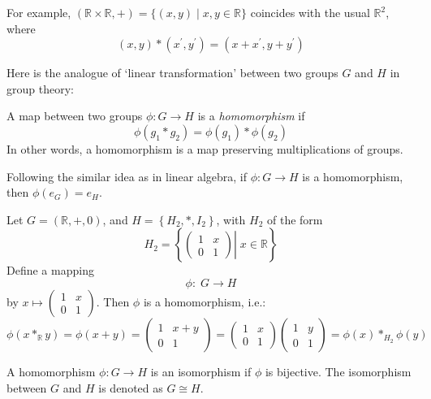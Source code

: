 For example, \(\left( {\mathbb{R} \times  \mathbb{R}, + }\right)  = \{ \left( {x,y}\right)  \mid  x,y \in  \mathbb{R}\}\) coincides with the usual \({\mathbb{R}}^{2}\), where
\[
\left( {x,y}\right)  * \left( {{x}^{\prime },{y}^{\prime }}\right)  = \left( {x + {x}^{\prime },y + {y}^{\prime }}\right)
\]

Here is the analogue of `linear transformation' between two groups $G$ and $H$ in group theory:
\begin{definition} A map between two groups \(\phi  : G \rightarrow  H\) is a \emph{homomorphism} if
\[
\phi \left( {{g}_{1} * {g}_{2}}\right)  = \phi \left( {g}_{1}\right)  * \phi \left( {g}_{2}\right)
\]
In other words, a homomorphism is a map preserving multiplications of groups.
\end{definition}
Following the similar idea as in linear algebra, if \(\phi  : G \rightarrow  H\) is a homomorphism, then \(\phi \left( {e}_{G}\right)  = {e}_{H}\).

\begin{example} Let \(G = \left( {\mathbb{R},+,0}\right)\), and \(H = \left\{  {{H}_{2},*,{I}_{2}}\right\}\), with \({H}_{2}\) of the form
\[
{H}_{2} = \left\{  {\left. \left( \begin{array}{ll} 1 & x \\  0 & 1 \end{array}\right) \right| \;x \in  \mathbb{R}}\right\}
\]
Define a mapping
\[
\phi  : \;G \rightarrow  H
\]
by \(x \mapsto  \left( \begin{array}{ll} 1 & x \\  0 & 1 \end{array}\right)\). Then \(\phi\) is a homomorphism, i.e.:
\[
\phi \left( {x{ * }_{\mathbb{R}}y}\right)  = \phi \left( {x + y}\right)= \left( \begin{matrix} 1 & x + y \\  0 & 1 \end{matrix}\right)= \left( \begin{array}{ll} 1 & x \\  0 & 1 \end{array}\right) \left( \begin{array}{ll} 1 & y \\  0 & 1 \end{array}\right) = \phi \left( x\right)  *_ {{H}_{2}}\phi \left( y\right)
\]
\end{example}

\begin{definition} [Isomorphism] A homomorphism \(\phi  : G \rightarrow  H\) is an isomorphism if \(\phi\) is bijective. The isomorphism between \(G\) and \(H\) is denoted as \(G \cong  H\).
\end{definition}

